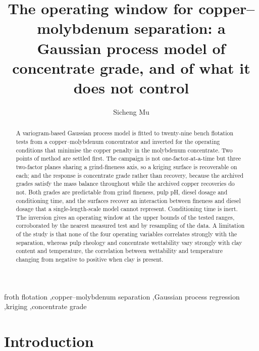 \documentclass[final,11pt,nopreprintline]{elsarticle}
\begin{document}
\begin{frontmatter}

\title{The operating window for copper--molybdenum separation: a Gaussian
process model of concentrate grade, and of what it does not control}

\author{Sicheng Mu}

\begin{abstract}
A variogram-based Gaussian process model is fitted to twenty-nine bench
flotation tests from a copper--molybdenum concentrator and inverted for
the operating conditions that minimise the copper penalty in the
molybdenum concentrate. Two points of method are settled first. The
campaign is not one-factor-at-a-time but three two-factor planes sharing
a grind-fineness axis, so a kriging surface is recoverable on each; and
the response is concentrate grade rather than recovery, because the
archived grades satisfy the mass balance throughout while the archived
copper recoveries do not. Both grades are predictable from grind
fineness, pulp pH, diesel dosage and conditioning time, and the surfaces
recover an interaction between fineness and diesel dosage that a
single-length-scale model cannot represent. Conditioning time is inert.
The inversion gives an operating window at the upper bounds of the
tested ranges, corroborated by the nearest measured test and by
resampling of the data. A limitation of the study is that none of the
four operating variables correlates strongly with the separation,
whereas pulp rheology and concentrate wettability vary strongly with
clay content and temperature, the correlation between wettability and
temperature changing from negative to positive when clay is present.
\end{abstract}

\begin{keyword}
froth flotation \sep copper--molybdenum separation \sep Gaussian process
regression \sep kriging \sep concentrate grade
\end{keyword}
\end{frontmatter}

\section{Introduction}
\end{document}
